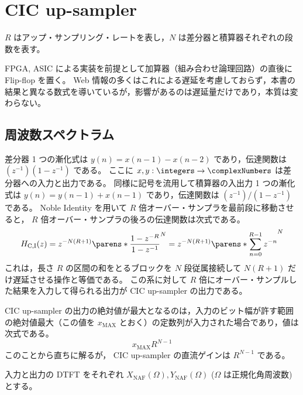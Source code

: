 \section{CIC up-sampler}
    \label{CIC up-sampler}
    \newcommand{\XNAF}{X_\text{NAF}}
    \newcommand{\YNAF}{Y_\text{NAF}}
    \newcommand{\tYNAF}{\tilde{Y}_\text{NAF}}
    \newcommand{\XNF}{X_\text{NF}}
    \newcommand{\YNF}{Y_\text{NF}}
    \newcommand{\tYNF}{\tilde{Y}_\text{NF}}

    $R$ はアップ・サンプリング・レートを表し，$N$ は差分器と積算器それぞれの段数を表す。
    \par
    FPGA, ASIC による実装を前提として加算器（組み合わせ論理回路）の直後に Flip-flop を置く。
    Web 情報の多くはこれによる遅延を考慮しておらず，本書の結果と異なる数式を導いているが，影響があるのは遅延量だけであり，本質は変わらない。
    \subsection{周波数スペクトラム}
        \label{CIC up-sampler の周波数スペクトラム}
        差分器 1 つの漸化式は $y(n) = x(n-1) - x(n-2)$ であり，伝達関数は $(z^{-1})(1-z^{-1})$ である。
        ここに $x,y:\integers\to\complexNumbers$ は差分器への入力と出力である。
        同様に記号を流用して積算器の入出力 1 つの漸化式は $y(n) = y(n-1) + x(n-1)$ であり，伝達関数は $(z^{-1})/(1-z^{-1})$ である。
        Noble Identity を用いて $R$ 倍オーバー・サンプラを最前段に移動させると， $R$ 倍オーバー・サンプラの後ろの伝達関数は次式である。
        \[ H_\text{C,I}(z) = z^{-N(R+1)}\parens*{\frac{1-z^{-R}}{1-z^{-1}}}^N = z^{-N(R+1)}\parens*{\sum_{n=0}^{R-1} z^{-n}}^N \]
        これは，長さ $R$ の区間の和をとるブロックを $N$ 段従属接続して $N(R+1)$ だけ遅延させる操作と等価である。
        この系に対して $R$ 倍にオーバー・サンプルした結果を入力して得られる出力が CIC up-sampler の出力である。
        \par
        CIC up-sampler の出力の絶対値が最大となるのは，入力のビット幅が許す範囲の絶対値最大（この値を $x_\text{MAX}$ とおく）の定数列が入力された場合であり，値は次式である。
        \begin{equation}
            x_\text{MAX}R^{N-1}
            \label{equation:CIC up-sampler の出力の絶対値の最大値}
        \end{equation}
        このことから直ちに解るが， CIC up-sampler の直流ゲインは $R^{N-1}$ である。
        \par
        入力と出力の DTFT をそれぞれ $\XNAF(\Omega), \YNAF(\Omega)$ ($\Omega$ は正規化角周波数) とする。
